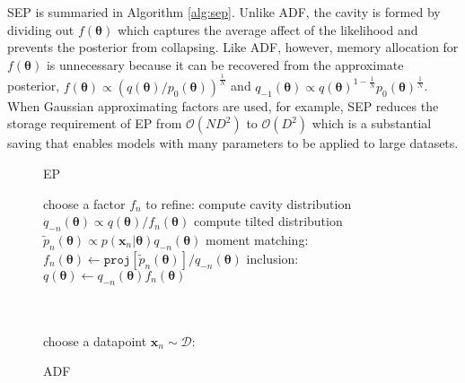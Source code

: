 SEP is summaried in Algorithm \ref{alg:sep}. Unlike ADF, the cavity is formed by dividing out $f(\bm{\theta})$ which captures the average affect of the likelihood and prevents the posterior from collapsing. Like ADF, however, memory allocation for $f(\bm{\theta})$ is unnecessary because it can be recovered from the approximate posterior, $f(\bm{\theta}) \propto (q(\bm{\theta}) / p_0(\bm{\theta}))^{\frac{1}{N}}$ and $q_{-1}(\bm{\theta}) \propto q(\bm{\theta})^{1 - \frac{1}{N}} p_0(\bm{\theta})^{\frac{1}{N}}$. When Gaussian approximating factors are used, for example, SEP reduces the storage requirement of EP from  $\mathcal{O}(ND^2)$ to $\mathcal{O}(D^2)$ which is a substantial saving that enables models with many parameters to be applied to large datasets. 

\begin{figure}[!t]
\begin{minipage}[t]{0.33\linewidth}
\centering
\begin{algorithm}[H] 
\caption{EP} \small
\label{alg:ep} 
\begin{algorithmic}[1] 
	\STATE choose a factor $f_n$ to refine:
	\STATE compute cavity distribution \\$q_{-n}(\bm{\theta}) \propto q(\bm{\theta}) / f_n(\bm{\theta})$ 
	\STATE compute tilted distribution \\$\tilde{p}_n(\bm{\theta}) \propto p(\bm{x}_n|\bm{\theta}) q_{-n}(\bm{\theta})$
	\STATE moment matching: \\ \hspace{-1mm}$f_n(\bm{\theta}) \leftarrow \mathtt{proj}[\tilde{p}_n(\bm{\theta})] / q_{-n}(\bm{\theta}) $
	\STATE inclusion:\\ $q(\bm{\theta}) \leftarrow q_{-n}(\bm{\theta}) f_n(\bm{\theta})$\\\hspace{1mm}\\ \vspace{1.5mm} \hspace{1mm}\\
\end{algorithmic}
\end{algorithm}
\end{minipage}
%
\begin{minipage}[t]{0.33\linewidth}
\centering
\begin{algorithm}[H] 
\caption{ADF} \small
\label{alg:adf} 
\begin{algorithmic}[1] 
	\STATE choose a datapoint $\bm{x}_n\sim \mathcal{D}$:

\end{algorithmic}
\end{algorithm}
\end{minipage}
\end{figure}
